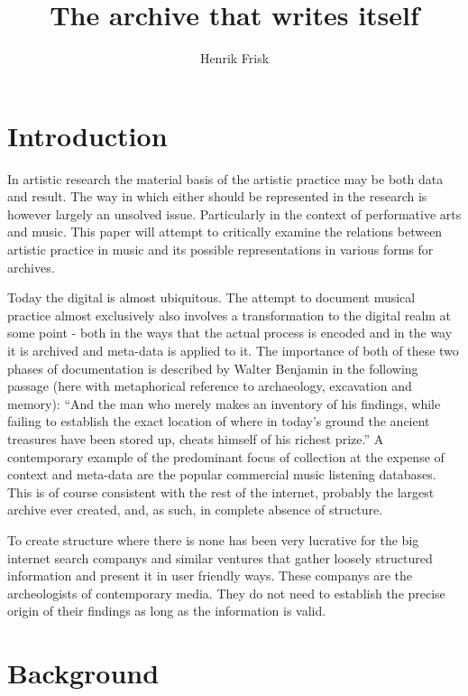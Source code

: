 \documentclass[12pt]{article}
\author{Henrik Frisk}
\title{The archive that writes itself}
\begin{document}
\maketitle


\section{Introduction}
\label{sec:introduction}


\noindent
In artistic research the material basis of the artistic practice may be both data and result. The way in which either should be represented in the research is however largely an unsolved issue. Particularly in the context of performative arts and music. This paper will attempt to critically examine the relations between artistic practice in music and its possible representations in various forms for archives.

Today the digital is almost ubiquitous. The attempt to document musical practice almost exclusively also involves a transformation to the digital realm at some point - both in the ways that the actual process is encoded and in the way it is archived and meta-data is applied to it. The importance of both of these two phases of documentation is described by Walter Benjamin in the following passage (here with metaphorical reference to archaeology, excavation and memory): ``And the man who merely makes an inventory of his findings, while failing to establish the exact location of where in today's ground the ancient treasures have been stored up, cheats himself of his richest prize.''\citep[p. 576]{benjamin2005} A contemporary example of the predominant focus of collection at the expense of context and meta-data are the popular commercial music listening databases. This is of course consistent with the rest of the internet, probably the largest archive ever created, and, as such, in complete absence of structure. %

To create structure where there is none has been very lucrative for the big internet search companys and similar ventures that gather loosely structured information and present it in user friendly ways. These companys are the archeologists of contemporary media. They do not need to establish the precise origin of their findings as long as the information is valid. 

\section{Background}
\label{sec:background}
\end{document}
